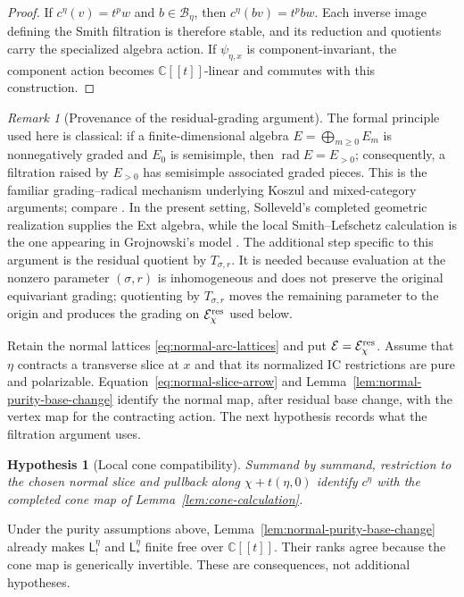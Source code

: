 \documentclass[11pt]{amsart}
\newtheorem{hypothesis}[theorem]{Hypothesis}
\theoremstyle{definition}
\theoremstyle{remark}
\newtheorem*{unnumberedremark}{Remark}
\newcommand{\C}{\mathbb C}
\newcommand{\A}{\C[[t]]}
\begin{document}
\begin{proof}
If $c^\eta(v)=t^p w$ and $b\in\mathcal B_\eta$, then
$c^\eta(bv)=t^pbw$.  Each inverse image defining the Smith filtration is
therefore stable, and its reduction and quotients carry the specialized
algebra action.  If $\psi_{\eta,x}$ is component-invariant, the component
action becomes $\A$-linear and commutes with this construction.
\end{proof}

\begin{unnumberedremark}[Provenance of the residual-grading argument]
The formal principle used here is classical: if a finite-dimensional algebra
$E=\bigoplus_{m\geq0}E_m$ is nonnegatively graded and $E_0$ is semisimple,
then $\operatorname{rad}E=E_{>0}$; consequently, a filtration raised by
$E_{>0}$ has semisimple associated graded pieces.  This is the familiar
grading--radical mechanism underlying Koszul and mixed-category arguments;
compare \cite[Section~2.1]{BGS}.  In the present setting, Solleveld's
completed geometric realization supplies the Ext algebra, while the local
Smith--Lefschetz calculation is the one appearing in Grojnowski's model
\cite[Section~2.3]{GrojnowskiJantzen}.  The additional step specific to this
argument is the residual quotient by $T_{\sigma,r}$.  It is needed because
evaluation at the nonzero parameter $(\sigma,r)$ is inhomogeneous and does
not preserve the original equivariant grading; quotienting by
$T_{\sigma,r}$ moves the remaining parameter to the origin and produces the
grading on $\mathcal E_\chi^{\rm res}$ used below.
\end{unnumberedremark}

Retain the normal lattices \eqref{eq:normal-arc-lattices} and put
$\mathcal E=\mathcal E_\chi^{\rm res}$.  Assume that $\eta$ contracts a
transverse slice at $x$ and that its normalized IC restrictions are pure
and polarizable.  Equation~\eqref{eq:normal-slice-arrow} and
Lemma~\ref{lem:normal-purity-base-change} identify the normal map, after
residual base change, with the vertex map for the contracting action.
The next hypothesis records what the filtration argument uses.

\begin{hypothesis}[Local cone compatibility]
\label{hyp:local-cone-compatibility}
Summand by summand, restriction to the chosen normal slice and pullback
along $\chi+t(\eta,0)$ identify $c^\eta$ with the completed cone map of
Lemma~\ref{lem:cone-calculation}.
\end{hypothesis}

Under the purity assumptions above, Lemma~\ref{lem:normal-purity-base-change}
already makes $\mathsf L_!^\eta$ and $\mathsf L_*^\eta$ finite free over
$\A$.  Their ranks agree because the cone map is generically invertible.
These are consequences, not additional hypotheses.
\end{document}
